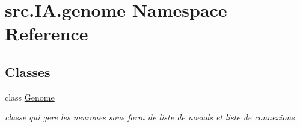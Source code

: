 \hypertarget{namespacesrc_1_1_i_a_1_1genome}{}\section{src.\+I\+A.\+genome Namespace Reference}
\label{namespacesrc_1_1_i_a_1_1genome}
\subsection*{Classes}
\begin{DoxyCompactItemize}
\item 
class \hyperlink{classsrc_1_1_i_a_1_1genome_1_1_genome}{Genome}
\begin{DoxyCompactList}\small\item\em classe qui gere les neurones sous form de liste de noeuds et liste de connexions \end{DoxyCompactList}\end{DoxyCompactItemize}
